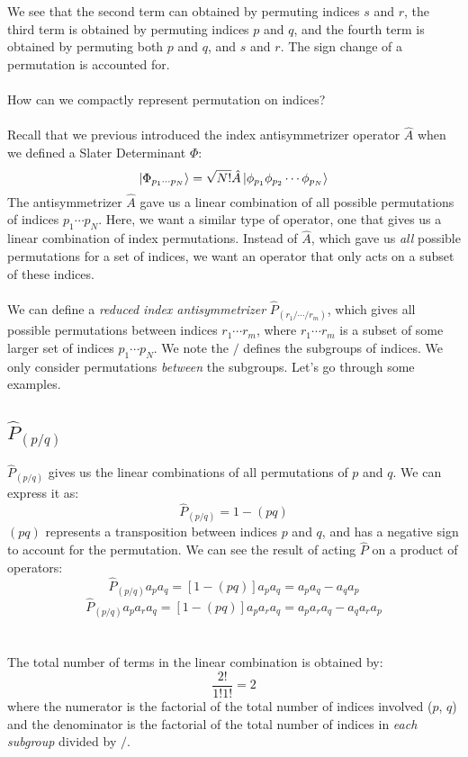 \documentclass{article}
\newcommand{\cd}{\ensuremath{\cdots} }
\begin{document}
We see that the second term can obtained by permuting indices $s$ and $r$, the third term is obtained by permuting indices $p$ and $q$, and the fourth term is obtained 
by permuting both $p$ and $q$,  and $s$ and $r$. The sign change of a permutation is accounted for. 
\\ \\
How can we compactly represent permutation on indices? 
\\ \\
Recall that we previous introduced the index antisymmetrizer operator $\hat{A}$ when we defined a Slater Determinant $\Phi$: 
 \[ \ket{\Phi_{p_1 \cdots p_N}} =  \sqrt{N!} \hat{A} \ket{\phi_{p_1}\phi_{p_2} \cdots \phi_{p_N}} \]
The antisymmetrizer $\hat{A}$ gave us a linear combination of all possible permutations of indices $p_1 \cd p_N$. 
Here, we want a similar type of operator, one that gives us a linear combination of index permutations. 
Instead of $\hat{A}$, which gave us \textit{all} possible permutations for a set of indices, we want an operator that only acts on a subset of these indices. \\ \\
We can define a \textit{reduced index antisymmetrizer} $\hat{P}_{(r_1 / \cd / r_m)}$, which gives all possible permutations between indices $r_1 \cd  r_m$, where 
$r_1 \cd  r_m$ is a subset of some larger set of indices $p_1 \cd p_N$. 
We note the $/$ defines the subgroups of indices. 
We only consider permutations \textit{between} the subgroups. 
Let's go through some examples. 
\subsection{$\hat{P}_{(p/q)}$}
$\hat{P}_{(p/q)}$ gives us the linear combinations of all permutations of $p$ and $q$. 
We can express it as: 
\[\hat{P}_{(p/q)} = 1 - (pq) \]
$(pq)$ represents a transposition between indices $p$ and $q$, and has a negative sign to account for the permutation. 
We can see the result of acting $\hat{P}$ on a product of operators: 
\[\hat{P}_{(p/q)} a_p a_q = [1 - (pq) ] a_p a_q = a_p a_q - a_q a_p \]
\[\hat{P}_{(p/q)} a_p a_r a_q = [1 - (pq) ] a_p a_r a_q = a_p a_r a_q - a_q a_r a_p \]
\\ \\
The total number of terms in the linear combination is obtained by:
\[\frac{2!}{1! 1!} = 2 \]
where the numerator is the factorial of the total number of indices involved ($p$, $q$) 
and the denominator is the factorial of the total number of indices in \textit{each subgroup} divided by $/$. 
\end{document}
